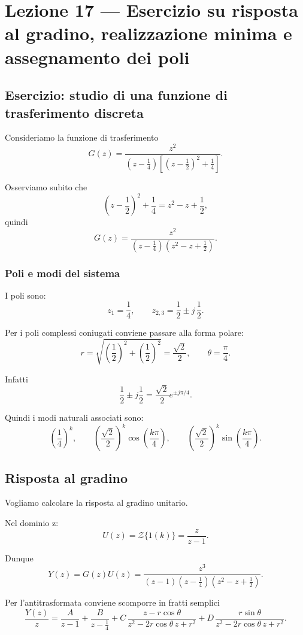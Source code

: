 \chapter{Lezione 17 --- Esercizio su risposta al gradino, realizzazione minima e assegnamento dei poli}

\section{Esercizio: studio di una funzione di trasferimento discreta}

Consideriamo la funzione di trasferimento
\[
G(z)=\frac{z^2}{\left(z-\frac14\right)\left[\left(z-\frac12\right)^2+\frac14\right]}.
\]

Osserviamo subito che
\[
\left(z-\frac12\right)^2+\frac14
=
z^2-z+\frac12,
\]
quindi
\[
G(z)=\frac{z^2}{\left(z-\frac14\right)\left(z^2-z+\frac12\right)}.
\]

\subsection{Poli e modi del sistema}

I poli sono:
\[
z_1=\frac14,
\qquad
z_{2,3}=\frac12\pm j\,\frac12.
\]

Per i poli complessi coniugati conviene passare alla forma polare:
\[
r=\sqrt{\left(\frac12\right)^2+\left(\frac12\right)^2}
=\frac{\sqrt{2}}{2},
\qquad
\theta=\frac{\pi}{4}.
\]

Infatti
\[
\frac12\pm j\frac12
=
\frac{\sqrt2}{2}e^{\pm j\pi/4}.
\]

Quindi i modi naturali associati sono:
\[
\left(\frac14\right)^k,
\qquad
\left(\frac{\sqrt2}{2}\right)^k \cos\!\left(\frac{k\pi}{4}\right),
\qquad
\left(\frac{\sqrt2}{2}\right)^k \sin\!\left(\frac{k\pi}{4}\right).
\]

\section{Risposta al gradino}

Vogliamo calcolare la risposta al gradino unitario.

Nel dominio z:
\[
U(z)=\mathcal{Z}\{1(k)\}=\frac{z}{z-1}.
\]

Dunque
\[
Y(z)=G(z)U(z)
=
\frac{z^3}{(z-1)\left(z-\frac14\right)\left(z^2-z+\frac12\right)}.
\]

Per l'antitrasformata conviene scomporre in fratti semplici
\[
\frac{Y(z)}{z}
=
\frac{A}{z-1}
+
\frac{B}{z-\frac14}
+
C\,\frac{z-r\cos\theta}{z^2-2r\cos\theta\,z+r^2}
+
D\,\frac{r\sin\theta}{z^2-2r\cos\theta\,z+r^2}.
\]

